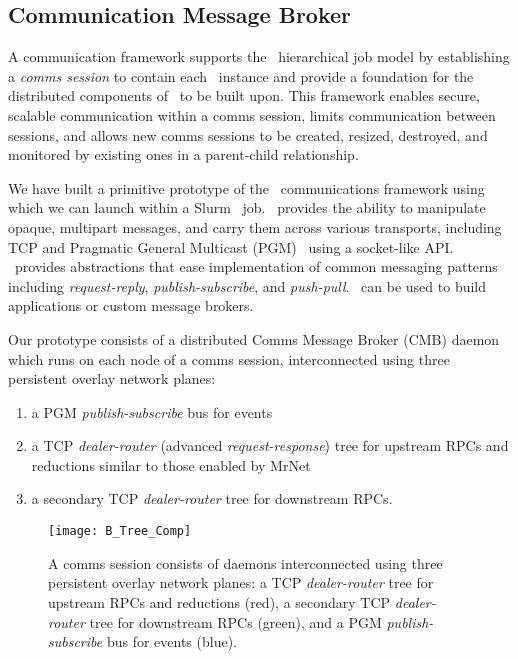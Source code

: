 \subsection{Communication Message Broker}

A communication framework supports the \flux\ hierarchical job model
by establishing a {\em comms session} to contain each \flux\ instance
and provide a foundation for the distributed components of \flux\ to
be built upon.
This framework enables secure, scalable communication
within a comms session, limits communication between sessions,
and allows new comms sessions to be created, resized, destroyed,
and monitored by existing ones in a parent-child relationship.

We have built a primitive prototype of the \flux\ communications framework
using \zMQ~\cite{ZMQGuide} which we can launch within a
Slurm~\cite{Jette02slurm} job.
\zMQ\ provides the ability to manipulate opaque,
multipart messages, and carry them across various transports, including
TCP and Pragmatic General Multicast (PGM)~\cite{rfc3208}
using a socket-like API.
\zMQ\ provides abstractions that ease implementation of common
messaging patterns including {\em request-reply}, {\em publish-subscribe},
and {\em push-pull}.
\zMQ\ can be used to build applications or custom message brokers.

Our prototype consists of a distributed Comms Message Broker (CMB)
daemon which runs on each node of a comms session, interconnected using
three persistent overlay network planes:
\begin{enumerate}
\item{a PGM {\em publish-subscribe} bus for events}
\item{a TCP {\em dealer-router} (advanced {\em request-response})
tree for upstream RPCs and reductions
similar to those enabled by MrNet~\cite{mrnet}}
\item{a secondary TCP {\em dealer-router} tree for downstream RPCs.}
\end{enumerate}

\begin{figure}
\centering
\texttt{[image: B\_Tree\_Comp]}
\caption{A comms session consists of daemons interconnected using
three persistent overlay network planes:
a TCP {\em dealer-router} tree for upstream RPCs and reductions (red),
a secondary TCP {\em dealer-router} tree for downstream RPCs (green), and
a PGM {\em publish-subscribe} bus for events (blue).}
\label{fig:commswireup}
\end{figure}

